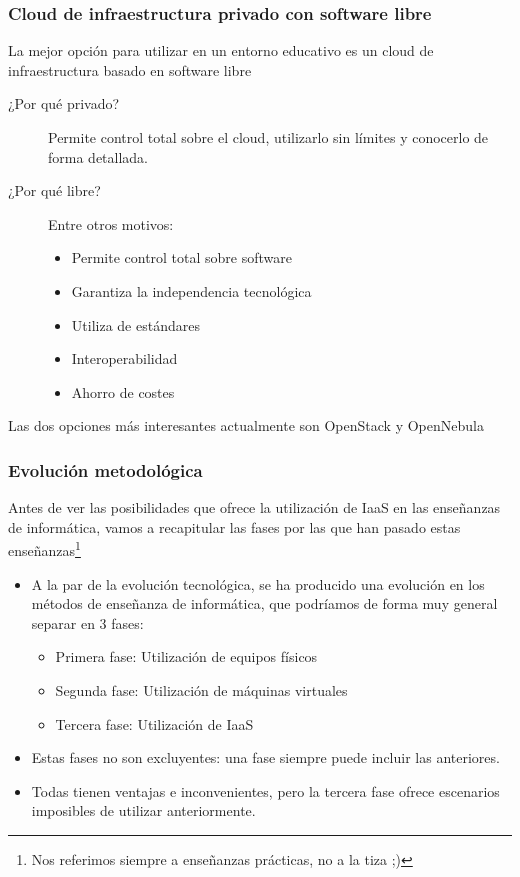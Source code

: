 \documentclass{beamer}
\begin{document}
\begin{frame}
  \frametitle{Cloud de infraestructura privado con software libre}
  La mejor opción para utilizar en un entorno educativo es un cloud de
  infraestructura basado en software libre
  \begin{description}
  \item[¿Por qué privado?] Permite control total sobre el cloud,
    utilizarlo sin límites y conocerlo de forma detallada.
  \item[¿Por qué libre?] Entre otros motivos:
    \begin{itemize}
    \item Permite control total sobre software
    \item Garantiza la independencia tecnológica
    \item Utiliza  de estándares
    \item Interoperabilidad
    \item Ahorro de costes
    \end{itemize}
  \end{description}
Las dos opciones más interesantes actualmente son OpenStack y OpenNebula
\end{frame}

\begin{frame}
  \frametitle{Evolución metodológica}
  Antes de ver las posibilidades que ofrece la utilización de IaaS en las
  enseñanzas de informática, vamos a recapitular las fases por las que han
  pasado estas enseñanzas\footnote{Nos referimos siempre a enseñanzas prácticas,
  no a la tiza ;)}
  \begin{itemize}
  \item A la par de la evolución tecnológica, se ha producido una evolución en
    los métodos de enseñanza de informática, que podríamos de forma muy general
    separar en 3 fases:
    \begin{itemize}
    \item Primera fase: Utilización de equipos físicos
    \item Segunda fase: Utilización de máquinas virtuales
    \item Tercera fase: Utilización de IaaS
    \end{itemize}
  \item Estas fases no son excluyentes: una fase siempre puede incluir las
    anteriores.
  \item Todas tienen ventajas e inconvenientes, pero la tercera fase ofrece
    escenarios imposibles de utilizar anteriormente.

  \end{itemize}
\end{frame}
\end{document}
